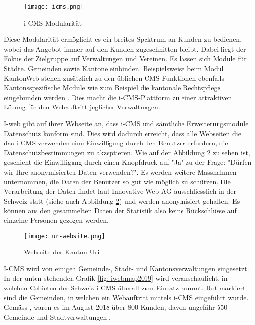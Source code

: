 \begin{figure}[h]
  \centering
  \texttt{[image: icms.png]}
  \caption{i-CMS Modularität \parencite{iweb2019revue}}
  \label{fig: icms}
\end{figure}

Diese Modularität ermöglicht es ein breites Spektrum an Kunden zu bedienen, wobei das Angebot immer auf den Kunden zugeschnitten bleibt. Dabei liegt der Fokus der Zielgruppe auf Verwaltungen und Vereinen. Es lassen sich Module für Städte, Gemeinden sowie Kantone einbinden. Beispielsweise beim Modul KantonWeb stehen zusätzlich zu den üblichen CMS-Funktionen ebenfalls Kantonsspezifische Module wie zum Beispiel die kantonale Rechtspflege eingebunden werden \parencite{iwebwebsiteKanotonWeb}. Dies macht die i-CMS-Plattform zu einer attraktiven Lösung für den Webauftritt jeglicher Verwaltungen. 

I-web gibt auf ihrer Webseite \parencite{iwebwebsiteKanotonWeb} an, dass i-CMS und sämtliche Erweiterungsmodule Datenschutz konform sind. Dies wird dadurch erreicht, dass alle Webseiten die das i-CMS verwenden eine Einwilligung durch den Benutzer erfordern, die Datenschutzbestimmungen zu akzeptieren. Wie auf der Abbildung \ref{fig: urweb} zu sehen ist, geschieht die Einwilligung durch einen Knopfdruck auf "Ja" zu der Frage: "Dürfen wir Ihre anonymisierten Daten verwenden?". Es werden weitere Massnahmen unternommen, die Daten der Benutzer so gut wie möglich zu schützen. Die Verarbeitung der Daten findet laut Innovative Web AG \parencite{iwebwebsiteCMS} ausschliesslich in der Schweiz statt (siehe auch Abbildung \ref{fig: urweb}) und werden anonymisiert gehalten. Es können aus den gesammelten Daten der Statistik also keine Rückschlüsse auf einzelne Personen gezogen werden. 

\begin{figure}[h]
  \centering
  \texttt{[image: ur-website.png]}
  \caption{Webseite des Kanton Uri \parencite{webseiteKantonUri}}
  \label{fig: urweb}
\end{figure}

I-CMS wird von einigen Gemeinde-, Stadt- und Kantonsverwaltungen eingesetzt. In der unten stehenden Grafik \ref{fig: iwebmap2019} wird veranschaulicht, in welchen Gebieten der Schweiz i-CMS überall zum Einsatz kommt. Rot markiert sind die Gemeinden, in welchen ein Webauftritt mittels i-CMS eingeführt wurde. Gemäss \parencite[S. 14]{iweb2018revue}, waren es im August 2018 über 800 Kunden, davon ungefähr 550 Gemeinde und Stadtverwaltungen \parencite{iwebwebsiteGemeindeWeb}.

